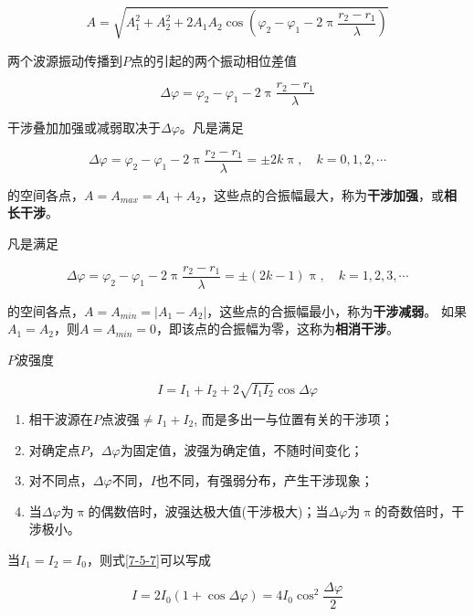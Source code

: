 \documentclass[12pt, a4paper]{article}
\numberwithin{equation}{section}
\begin{document}
    \begin{equation}
        A=\sqrt{A_1^2+A_2^2+2 A_1 A_2 \cos \left(\varphi_2-\varphi_1-2 \uppi \frac{r_2-r_1}{\lambda}\right)}
    \end{equation}

    两个波源振动传播到\(P\)点的引起的两个振动相位差值

    \begin{equation}
        \Delta \varphi=\varphi_2-\varphi_1-2 \uppi \frac{r_2-r_1}{\lambda}
    \end{equation}

    干涉叠加加强或减弱取决于\(\Delta \varphi\)。凡是满足

    \begin{equation}
        \Delta \varphi=\varphi_2-\varphi_1-2 \uppi \frac{r_2-r_1}{\lambda}= \pm 2 k \uppi, \quad k=0,1,2, \cdots
    \end{equation}

    的空间各点，\(A = A_{max} = A_1+A_2\)，这些点的合振幅最大，称为\textbf{干涉加强}，或\textbf{相长干涉}。

    凡是满足

    \begin{equation}
        \Delta \varphi=\varphi_2-\varphi_1-2 \uppi \frac{r_2-r_1}{\lambda}= \pm(2 k-1) \uppi, \quad k=1,2,3, \cdots
    \end{equation}

    的空间各点，\(A = A_{min} = \left|A_1-A_2\right|\)，这些点的合振幅最小，称为\textbf{干涉减弱}。
    如果\(A_1=A_2\)，则\(A = A_{min} = 0\)，即该点的合振幅为零，这称为\textbf{相消干涉}。

    \(P\)波强度

    \begin{equation}
        I=I_1+I_2+2 \sqrt{I_1 I_2} \cos \Delta \varphi
        \label{7-5-7}
    \end{equation}

    \begin{enumerate}
        \item 相干波源在\(P\)点波强\(\neq I_1+I_2\), 而是多出一与位置有关的干涉项；
        \item 对确定点\( P\)，\(\Delta \varphi\)为固定值，波强为确定值，不随时间变化；
        \item 对不同点，\(\Delta \varphi\)不同，\(I\)也不同，有强弱分布，产生干涉现象；
        \item 当\(\Delta \varphi\)为\(\uppi\)的偶数倍时，波强达极大值(干涉极大)；当\(\Delta \varphi\)为\(\uppi\)的奇数倍时，干涉极小。
    \end{enumerate}

    当\(I_1=I_2=I_0\)，则式\ref{7-5-7}可以写成

    \begin{equation}
        I=2 I_0(1+\cos \Delta \varphi)=4 I_0 \cos ^2 \frac{\Delta \varphi}{2}
    \end{equation}
\end{document}
